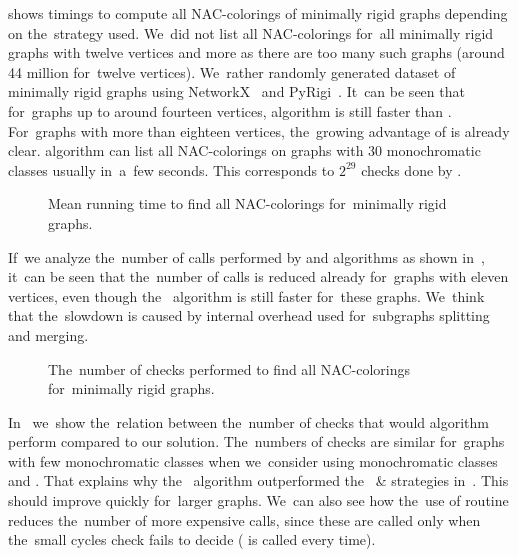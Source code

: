 shows timings to compute all NAC-colorings of minimally rigid graphs
depending on the~strategy used.
We~did not list all NAC-colorings for~all minimally rigid graphs with twelve vertices and more
as there are too many such graphs (around 44 million for~twelve vertices).
%
We~rather randomly generated dataset of minimally rigid graphs
using NetworkX~\cite{networkx} and PyRigi~\cite{pyrigi}.
%
It~can be seen that for~graphs up to around fourteen vertices, \NaiveCycles{} algorithm
is still faster than \Subgraphs{}.
For~graphs with more than eighteen vertices,
the~growing advantage of \Subgraphs{} is already clear.
\Subgraphs{} algorithm can list all NAC-colorings on graphs with 30 monochromatic classes
usually in~a~few seconds.
This corresponds to \( 2^{29} \) checks done by \NaiveCycles{}.

\begin{figure}[ht]
	\centering
	\scalebox{\BenchFigureScale}{}
	\caption[Running time for~minimally rigid graphs]{
		Mean running time to find all NAC-colorings for~minimally rigid graphs.}%
	\label{fig:graph_time_minimally_rigid}
\end{figure}%

If~we analyze the~number of \IsNACColoring{} calls performed by \NaiveCycles{} and \Subgraphs{} algorithms
as shown in~,
it~can be seen that the~number of \IsNACColoring{} calls is reduced already for~graphs
with eleven vertices,
even though the~\NaiveCycles{} algorithm is still faster for~these graphs.
%
We~think that the~slowdown is caused by internal overhead
used for~subgraphs splitting and merging.

\begin{figure}[ht]
	\centering
	\scalebox{\BenchFigureScale}{}
	\caption[Checks performed for~minimally rigid graphs]{
		The~number of checks performed to find all NAC-colorings for~minimally rigid graphs.}%
	\label{fig:graph_count_minimally_rigid}
\end{figure}%

In~
we~show the~relation between the~number of \IsNACColoring{} checks that
would \Naive{} algorithm perform compared to our solution.
%
The~numbers of checks are similar for~graphs with few monochromatic classes
when we~consider \NaiveCycles{} using monochromatic classes and \Subgraphs{}.
That explains why the~\NaiveCycles{} algorithm outperformed
the~\NeighborsDegree{} \& \MergeLinear{} strategies in~. This should improve quickly for~larger graphs.
We~can also see how the~use of \CycleMask{} routine
reduces the~number of more expensive \IsNACColoring{} calls,
since these are called only when the~small cycles check \CycleMask{} fails to decide
(\CycleMask{} is called every time).

